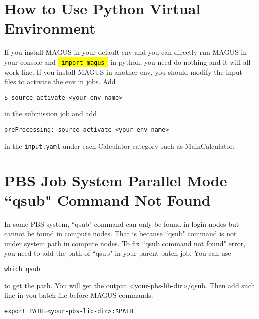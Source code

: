 \documentclass[12pt,oneside]{book}
\newcommand{\code}[1]{
  \begingroup
  \sethlcolor{Seashell}
  {\hl{\texttt{~#1~}}}
  \endgroup
}
\newcommand{\file}[1]{\texttt{#1}}
\begin{document}
\section{How to Use Python Virtual Environment}\label{sec: virtual environment}
If you install MAGUS in your default env and you can directly run MAGUS in your console and \code{import magus} in python, you need do nothing and it will all work fine. If you install MAGUS in another env, you should modify the input files to activate the env in jobs. Add
\begin{tcolorbox}
    \begin{verbatim}
$ source activate <your-env-name>
    \end{verbatim}
\end{tcolorbox}
in the submission job and add
\begin{tcolorbox}
    \begin{verbatim}
preProcessing: source activate <your-env-name>
    \end{verbatim}
\end{tcolorbox}
in the \file{input.yaml} under each Calculator category such as MainCalculator.

\section{PBS Job System Parallel Mode ``qsub" Command Not Found}\label{sec: pbs qsub}
In some PBS system, ``qsub" command can only be found in login nodes but cannot be found in compute nodes. That is because ``qsub" command is not under system path in compute nodes. To fix ``qsub command not found" error, you need to add the path of ``qsub" in your parent batch job. You can use
\begin{tcolorbox}
    \begin{verbatim}
which qsub
    \end{verbatim}
\end{tcolorbox}
to get the path. You will get the output <your-pbs-lib-dir>/qsub. Then add such line in you batch file before MAGUS commands:
\begin{tcolorbox}
    \begin{verbatim}
export PATH=<your-pbs-lib-dir>:$PATH
    \end{verbatim}
\end{tcolorbox}
\end{document}

